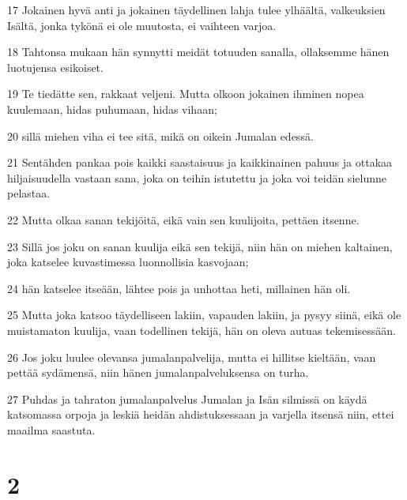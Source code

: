 \par 17 Jokainen hyvä anti ja jokainen täydellinen lahja tulee ylhäältä, valkeuksien Isältä, jonka tykönä ei ole muutosta, ei vaihteen varjoa.
\par 18 Tahtonsa mukaan hän synnytti meidät totuuden sanalla, ollaksemme hänen luotujensa esikoiset.
\par 19 Te tiedätte sen, rakkaat veljeni. Mutta olkoon jokainen ihminen nopea kuulemaan, hidas puhumaan, hidas vihaan;
\par 20 sillä miehen viha ei tee sitä, mikä on oikein Jumalan edessä.
\par 21 Sentähden pankaa pois kaikki saastaisuus ja kaikkinainen pahuus ja ottakaa hiljaisuudella vastaan sana, joka on teihin istutettu ja joka voi teidän sielunne pelastaa.
\par 22 Mutta olkaa sanan tekijöitä, eikä vain sen kuulijoita, pettäen itsenne.
\par 23 Sillä jos joku on sanan kuulija eikä sen tekijä, niin hän on miehen kaltainen, joka katselee kuvastimessa luonnollisia kasvojaan;
\par 24 hän katselee itseään, lähtee pois ja unhottaa heti, millainen hän oli.
\par 25 Mutta joka katsoo täydelliseen lakiin, vapauden lakiin, ja pysyy siinä, eikä ole muistamaton kuulija, vaan todellinen tekijä, hän on oleva autuas tekemisessään.
\par 26 Jos joku luulee olevansa jumalanpalvelija, mutta ei hillitse kieltään, vaan pettää sydämensä, niin hänen jumalanpalveluksensa on turha.
\par 27 Puhdas ja tahraton jumalanpalvelus Jumalan ja Isän silmissä on käydä katsomassa orpoja ja leskiä heidän ahdistuksessaan ja varjella itsensä niin, ettei maailma saastuta.

\chapter{2}

